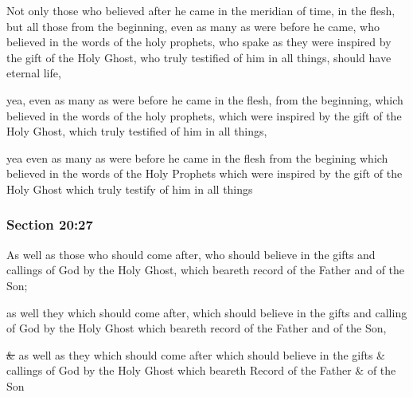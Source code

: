 		Not only those who believed after he came in the meridian of time, in the flesh, but all those from the beginning, even as many as were before he came, who believed in the words of the holy prophets, who spake as they were inspired by the gift of the Holy Ghost, who truly testified of him in all things, should have eternal life,

		\begin{framed}
		\scriptsize
			\begin{compactdesc}
				\item[JSP] yea, even as many as were before he came in the flesh, from the beginning, which believed in the words of the holy prophets, which were inspired by the gift of the Holy Ghost, which truly testified of him in all things,
				\item[RB1] yea even as many as were before he came in the flesh from the begining which believed in the words of the Holy Prophets which were inspired by the gift of the Holy Ghost which truly testify of him in all things
			\end{compactdesc}
		\end{framed}

	\subsubsection{Section 20:27} %
		\label{DC20-27}

		As well as those who should come after, who should believe in the gifts and callings of God by the Holy Ghost, which beareth record of the Father and of the Son;

		\begin{framed}
		\scriptsize
			\begin{compactdesc}
				\item[JSP] as well they which should come after, which should believe in the gifts and calling of God by the Holy Ghost which beareth record of the Father and of the Son,
				\item[RB1] \sout{\&} as well as they which should come after which should believe in the gifts \& callings of God by the Holy Ghost which beareth Record of the Father \& of the Son
			\end{compactdesc}
		\end{framed}

